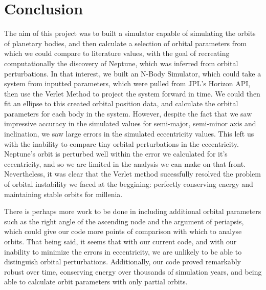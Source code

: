 \documentclass[a4paper,12pt]{article} %
\numberwithin{equation}{section} %
\numberwithin{figure}{section} %
\begin{document}
\section{Conclusion}
The aim of this project was to built a simulator capable of simulating the orbits of planetary bodies, and then calculate a selection of orbital parameters from which we could compare to literature values, with the goal of recreating computationally the discovery of Neptune, which was inferred from orbital perturbations. In that interest, we built an N-Body Simulator, which could take a system from inputted parameters, which were pulled from JPL's Horizon API, then use the Verlet Method to project the system forward in time. We could then fit an ellipse to this created orbital position data, and calculate the orbital parameters for each body in the system. However, despite the fact that we saw impressive accuracy in the simulated values for semi-major, semi-minor axis and inclination, we saw large errors in the simulated eccentricity values. This left us with the inability to compare tiny orbital perturbations in the eccentricity. Neptune's orbit is perturbed well within the error we calculated for it's eccentricity, and so we are limited in the analysis we can make on that front. Nevertheless, it was clear that the Verlet method sucessfully resolved the problem of orbital instability we faced at the beggining: perfectly conserving energy and maintaining stable orbits for millenia.

There is perhaps more work to be done in including additional orbital parameters such as the right angle of the ascending node and the argument of periapsis, which could give our code more points of comparison with which to analyse orbits. That being said, it seems that with our current code, and with our inability to minimize the errors in eccentricity, we are unlikely to be able to distinguish orbital perturbations. Additionally, our code proved remarkably robust over time, conserving energy over thousands of simulation years, and being able to calculate orbit parameters with only partial orbits.




\end{document}
